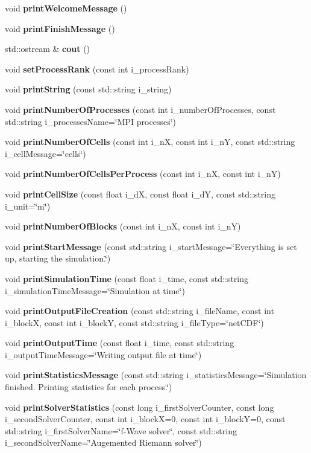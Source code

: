 \begin{DoxyCompactItemize}
\item 
void {\bf print\-Welcome\-Message} ()
\item 
void {\bf print\-Finish\-Message} ()
\item 
std\-::ostream \& {\bf cout} ()
\item 
void {\bf set\-Process\-Rank} (const int i\-\_\-process\-Rank)
\item 
void {\bf print\-String} (const std\-::string i\-\_\-string)
\item 
void {\bf print\-Number\-Of\-Processes} (const int i\-\_\-number\-Of\-Processes, const std\-::string i\-\_\-processes\-Name=\char`\"{}M\-P\-I processes\char`\"{})
\item 
void {\bf print\-Number\-Of\-Cells} (const int i\-\_\-n\-X, const int i\-\_\-n\-Y, const std\-::string i\-\_\-cell\-Message=\char`\"{}cells\char`\"{})
\item 
void {\bf print\-Number\-Of\-Cells\-Per\-Process} (const int i\-\_\-n\-X, const int i\-\_\-n\-Y)
\item 
void {\bf print\-Cell\-Size} (const float i\-\_\-d\-X, const float i\-\_\-d\-Y, const std\-::string i\-\_\-unit=\char`\"{}m\char`\"{})
\item 
void {\bf print\-Number\-Of\-Blocks} (const int i\-\_\-n\-X, const int i\-\_\-n\-Y)
\item 
void {\bf print\-Start\-Message} (const std\-::string i\-\_\-start\-Message=\char`\"{}Everything is set up, starting the simulation.\char`\"{})
\item 
void {\bf print\-Simulation\-Time} (const float i\-\_\-time, const std\-::string i\-\_\-simulation\-Time\-Message=\char`\"{}Simulation at time\char`\"{})
\item 
void {\bf print\-Output\-File\-Creation} (const std\-::string i\-\_\-file\-Name, const int i\-\_\-block\-X, const int i\-\_\-block\-Y, const std\-::string i\-\_\-file\-Type=\char`\"{}net\-C\-D\-F\char`\"{})
\item 
void {\bf print\-Output\-Time} (const float i\-\_\-time, const std\-::string i\-\_\-output\-Time\-Message=\char`\"{}Writing output file at time\char`\"{})
\item 
void {\bf print\-Statistics\-Message} (const std\-::string i\-\_\-statistics\-Message=\char`\"{}Simulation finished. Printing statistics for each process.\char`\"{})
\item 
void {\bf print\-Solver\-Statistics} (const long i\-\_\-first\-Solver\-Counter, const long i\-\_\-second\-Solver\-Counter, const int i\-\_\-block\-X=0, const int i\-\_\-block\-Y=0, const std\-::string i\-\_\-first\-Solver\-Name=\char`\"{}f-\/Wave solver\char`\"{}, const std\-::string i\-\_\-second\-Solver\-Name=\char`\"{}Augemented Riemann solver\char`\"{})

\end{DoxyCompactItemize}
